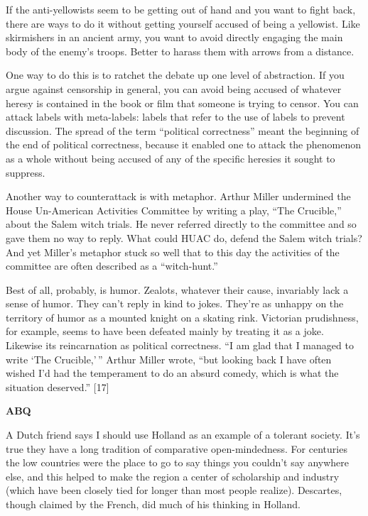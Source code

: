 If the anti-yellowists seem to be getting out of hand and you want to
fight back, there are ways to do it without getting yourself accused of
being a yellowist. Like skirmishers in an ancient army, you want to
avoid directly engaging the main body of the enemy's troops. Better to
harass them with arrows from a distance.

One way to do this is to ratchet the debate up one level of abstraction.
If you argue against censorship in general, you can avoid being accused
of whatever heresy is contained in the book or film that someone is
trying to censor. You can attack labels with meta-labels: labels that
refer to the use of labels to prevent discussion. The spread of the term
``political correctness'' meant the beginning of the end of political
correctness, because it enabled one to attack the phenomenon as a whole
without being accused of any of the specific heresies it sought to
suppress.

Another way to counterattack is with metaphor. Arthur Miller undermined
the House Un-American Activities Committee by writing a play, ``The
Crucible,'' about the Salem witch trials. He never referred directly to
the committee and so gave them no way to reply. What could HUAC do,
defend the Salem witch trials? And yet Miller's metaphor stuck so well
that to this day the activities of the committee are often described as
a ``witch-hunt.''

Best of all, probably, is humor. Zealots, whatever their cause,
invariably lack a sense of humor. They can't reply in kind to jokes.
They're as unhappy on the territory of humor as a mounted knight on a
skating rink. Victorian prudishness, for example, seems to have been
defeated mainly by treating it as a joke. Likewise its reincarnation as
political correctness. ``I am glad that I managed to write `The
Crucible,'\,'' Arthur Miller wrote, ``but looking back I have often
wished I'd had the temperament to do an absurd comedy, which is what the
situation deserved.'' {[}17{]}

\textbf{ABQ}

A Dutch friend says I should use Holland as an example of a tolerant
society. It's true they have a long tradition of comparative
open-mindedness. For centuries the low countries were the place to go to
say things you couldn't say anywhere else, and this helped to make the
region a center of scholarship and industry (which have been closely
tied for longer than most people realize). Descartes, though claimed by
the French, did much of his thinking in Holland.

